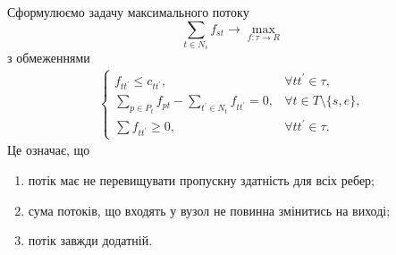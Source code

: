 Сформулюємо задачу максимального потоку
\begin{equation*}
    \sum_{t \in N_s} f_{st} \rightarrow \max_{f: \tau \rightarrow R }
\end{equation*}
з обмеженнями
\begin{equation*}
    \begin{gathered}
        \begin{cases}
            f_{tt^{'}} \leq  c_{tt^{'}},                                   & \forall tt^{'}  \in \tau ,         \\
            \sum_{p \in P_t} f_{pt} - \sum_{t^{'} \in N_t} f_{tt^{'}} = 0, & \forall t \in T \setminus \{s,e\}, \\
            \sum f_{tt^{'}} \geq 0,                                        & \forall tt^{'}  \in \tau.
        \end{cases}
    \end{gathered}
\end{equation*}
Це означає, що
\begin{enumerate}
    \item потік має не перевищувати пропускну здатність для всіх ребер;
    \item сума потоків, що входять у вузол не повинна змінитись на виході;
    \item потік завжди додатній.
\end{enumerate}

